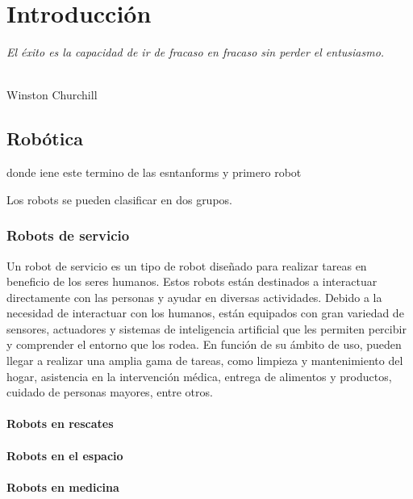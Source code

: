 \chapter{Introducción}
\label{cap:capitulo1}
\setcounter{page}{1}

\begin{flushright}
\begin{minipage}[]{10cm}
\emph{El éxito es la capacidad de ir de fracaso en fracaso sin perder el entusiasmo.}\\
\end{minipage}\\

Winston Churchill\\
\end{flushright}

\vspace{1cm}


\section{Robótica}
\label{sec:rob}

donde iene este termino
de las esntanforms y primero robot

Los robots se pueden clasificar en dos grupos.
\subsection{Robots de servicio}
Un robot de servicio es un tipo de robot diseñado para realizar tareas en beneficio de los seres humanos. Estos robots están 
destinados a interactuar directamente con las personas y ayudar en diversas actividades. 
Debido a la necesidad de interactuar con los humanos, están equipados con gran variedad de sensores, actuadores y sistemas de 
inteligencia artificial que les permiten percibir y comprender el entorno que los rodea. 
En función de su ámbito de uso, pueden llegar a realizar una amplia gama de tareas, como limpieza y mantenimiento del hogar, 
asistencia en la intervención médica, entrega de alimentos y productos, cuidado de personas mayores, entre otros.
\subsubsection{Robots en rescates}
\subsubsection{Robots en el espacio}
\subsubsection{Robots en medicina}


